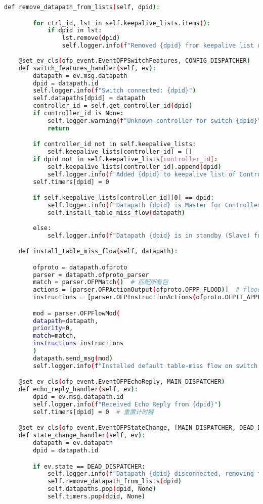 \documentclass{article}
\begin{document}
\begin{lstlisting}[language=bash, caption={多控制器保活检测机制代码}]
    def remove_datapath_from_lists(self, dpid):

        for ctrl_id, lst in self.keepalive_lists.items():
            if dpid in lst:
                lst.remove(dpid)
                self.logger.info(f"Removed {dpid} from keepalive list of Controller {ctrl_id}")
     
    @set_ev_cls(ofp_event.EventOFPSwitchFeatures, CONFIG_DISPATCHER)
    def switch_features_handler(self, ev):
        datapath = ev.msg.datapath
        dpid = datapath.id
        self.logger.info(f"Switch connected: {dpid}")
        self.datapaths[dpid] = datapath
        controller_id = self.get_controller_id(dpid)
        if controller_id is None:
            self.logger.warning(f"Unknown controller for switch {dpid}")
            return

        if controller_id not in self.keepalive_lists:
            self.keepalive_lists[controller_id] = []
        if dpid not in self.keepalive_lists[controller_id]:
            self.keepalive_lists[controller_id].append(dpid)
            self.logger.info(f"Added {dpid} to keepalive list of Controller {controller_id}")
        self.timers[dpid] = 0

        if self.keepalive_lists[controller_id][0] == dpid:
            self.logger.info(f"Datapath {dpid} is Master for Controller {controller_id}")
            self.install_table_miss_flow(datapath)
           
        else:
            self.logger.info(f"Datapath {dpid} is in standby (Slave) for Controller {controller_id}")

    def install_table_miss_flow(self, datapath):

        ofproto = datapath.ofproto
        parser = datapath.ofproto_parser
        match = parser.OFPMatch()  # 匹配所有包
        actions = [parser.OFPActionOutput(ofproto.OFPP_FLOOD)]  # flood到所有端口
        instructions = [parser.OFPInstructionActions(ofproto.OFPIT_APPLY_ACTIONS, actions)]

        mod = parser.OFPFlowMod(
        datapath=datapath,
        priority=0,
        match=match,
        instructions=instructions
        )
        datapath.send_msg(mod)
        self.logger.info(f"Installed default table-miss flow on switch {datapath.id}")

    @set_ev_cls(ofp_event.EventOFPEchoReply, MAIN_DISPATCHER)
    def echo_reply_handler(self, ev):
        dpid = ev.msg.datapath.id
        self.logger.info(f"Received Echo Reply from {dpid}")
        self.timers[dpid] = 0  # 重置计时器

    @set_ev_cls(ofp_event.EventOFPStateChange, [MAIN_DISPATCHER, DEAD_DISPATCHER])
    def state_change_handler(self, ev):
        datapath = ev.datapath
        dpid = datapath.id

        if ev.state == DEAD_DISPATCHER:
            self.logger.info(f"Datapath {dpid} disconnected, removing from keepalive list")
            self.remove_datapath_from_lists(dpid)
            self.datapaths.pop(dpid, None)
            self.timers.pop(dpid, None)                 
\end{lstlisting}
\end{document}
